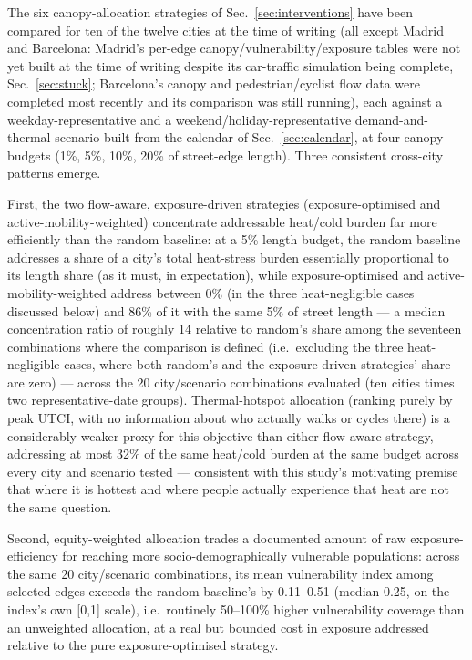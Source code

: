 \documentclass[pdflatex,sn-mathphys-ay]{sn-jnl}
\begin{document}
The six canopy-allocation strategies of Sec.~\ref{sec:interventions} have
been compared for ten of the twelve cities at the time of writing (all
except Madrid and Barcelona: Madrid's per-edge canopy/vulnerability/exposure
tables were not yet built at the time of writing despite its car-traffic
simulation being complete, Sec.~\ref{sec:stuck}; Barcelona's canopy and
pedestrian/cyclist flow data were completed most recently and its comparison
was still running), each against a weekday-representative and a
weekend/holiday-representative demand-and-thermal scenario built from the
calendar of Sec.~\ref{sec:calendar}, at four canopy budgets (1\%, 5\%, 10\%,
20\% of street-edge length). Three consistent cross-city patterns emerge.

First, the two flow-aware, exposure-driven strategies (exposure-optimised
and active-mobility-weighted) concentrate addressable heat/cold burden far
more efficiently than the random baseline: at a 5\% length budget, the
random baseline addresses a share of a city's total heat-stress burden
essentially proportional to its length share (as it must, in expectation),
while exposure-optimised and active-mobility-weighted address between 0\%
(in the three heat-negligible cases discussed below) and 86\% of it with the
same 5\% of street length --- a median concentration ratio of roughly 14
relative to random's share among the seventeen combinations where the
comparison is defined (i.e.\ excluding the three heat-negligible cases,
where both random's and the exposure-driven strategies' share are zero) ---
across the 20 city/scenario combinations evaluated (ten cities times two
representative-date groups). Thermal-hotspot allocation
(ranking purely by peak UTCI, with no information about who actually walks
or cycles there) is a considerably weaker proxy for this objective than
either flow-aware strategy, addressing at most 32\% of the same
heat/cold burden at the same budget across every city and scenario tested
--- consistent with this study's motivating premise that where it is hottest
and where people actually experience that heat are not the same question.

Second, equity-weighted allocation trades a documented amount of raw
exposure-efficiency for reaching more socio-demographically vulnerable
populations: across the same 20 city/scenario combinations, its mean
vulnerability index among selected edges exceeds the random baseline's by
0.11--0.51 (median 0.25, on the index's own [0,1] scale), i.e.\ routinely
50--100\% higher vulnerability coverage than an unweighted allocation, at a
real but bounded cost in exposure addressed relative to the pure
exposure-optimised strategy.
\end{document}
